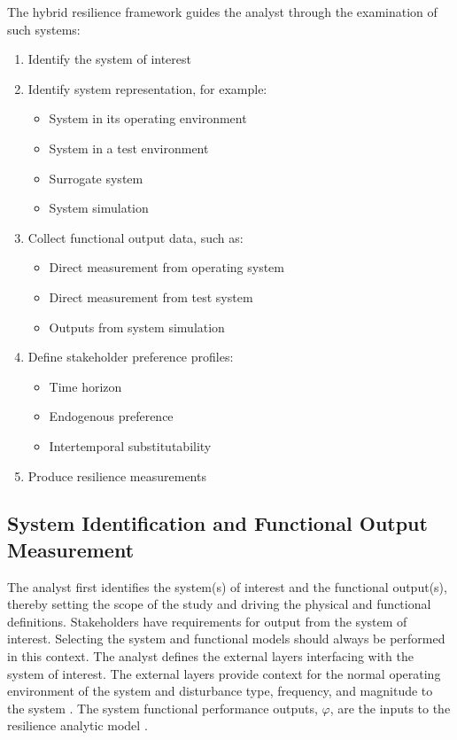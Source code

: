 \documentclass[preprint,12pt]{elsarticle}
\begin{document}

The hybrid resilience framework guides the analyst through the examination of such systems:
\begin{enumerate}
  \item Identify the system of interest
  \item Identify system representation, for example:
    \begin{itemize}
    \item System in its operating environment
    \item System in a test environment
    \item Surrogate system
    \item System simulation
    \end{itemize}
  \item Collect functional output data, such as:
    \begin{itemize}
    \item Direct measurement from operating system
    \item Direct measurement from test system
    \item Outputs from system simulation
    \end{itemize}
  \item Define stakeholder preference profiles:
    \begin{itemize}
    \item Time horizon
    \item Endogenous preference
    \item Intertemporal substitutability
    \end{itemize}
  \item Produce resilience measurements
\end{enumerate}



\subsection{System Identification and Functional Output Measurement}
The analyst first identifies the system(s) of interest and the
functional output(s), thereby setting the scope of the study and
driving the physical and functional definitions. Stakeholders have
requirements for output from the system of interest. Selecting the
system and functional models should always be performed in this
context. The analyst defines the external layers interfacing with the
system of interest. The external layers provide context for the normal
operating environment of the system and disturbance type, frequency,
and magnitude to the system \cite{APL2015}. The system functional
performance outputs, $\varphi$, are the inputs to the resilience
analytic model \cite{Ayyub2014a}.
\end{document}
